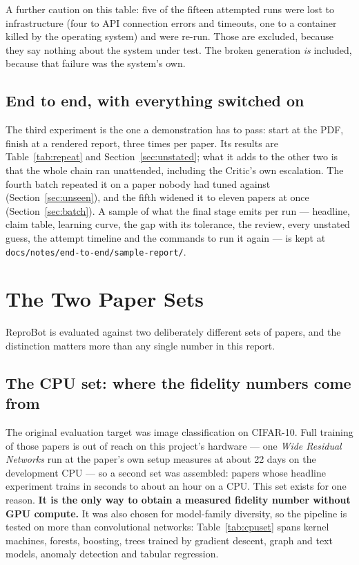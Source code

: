 \documentclass[10pt,twocolumn]{article}
\begin{document}
A further caution on this table: five of the fifteen attempted runs were lost to infrastructure
(four to API connection errors and timeouts, one to a container killed by the operating system)
and were re-run. Those are excluded, because they say nothing about the system under test. The
broken generation \emph{is} included, because that failure was the system's own.

\subsection{End to end, with everything switched on}

The third experiment is the one a demonstration has to pass: start at the PDF, finish at a
rendered report, three times per paper. Its results are Table~\ref{tab:repeat} and
Section~\ref{sec:unstated}; what it adds to the other two is that the whole chain ran unattended,
including the Critic's own escalation. The fourth batch repeated it on a paper nobody had tuned
against (Section~\ref{sec:unseen}), and the fifth widened it to eleven papers at once
(Section~\ref{sec:batch}). A sample of what the final stage emits per run --- headline,
claim table, learning curve, the gap with its tolerance, the review, every unstated guess, the
attempt timeline and the commands to run it again --- is kept at
\texttt{docs/notes/end-to-end/sample-report/}.

\section{The Two Paper Sets}
\label{sec:sets}

ReproBot is evaluated against two deliberately different sets of papers, and the distinction
matters more than any single number in this report.

\subsection{The CPU set: where the fidelity numbers come from}

The original evaluation target was image classification on CIFAR-10. Full training of those
papers is out of reach on this project's hardware --- one \emph{Wide Residual Networks} run at the
paper's own setup measures at about 22 days on the development CPU --- so a second set was
assembled: papers whose headline experiment trains in seconds to about an hour on a CPU. This set
exists for one reason. \textbf{It is the only way to obtain a measured fidelity number without GPU
compute.} It was also chosen for model-family diversity, so the pipeline is tested on more than
convolutional networks: Table~\ref{tab:cpuset} spans kernel machines, forests, boosting, trees
trained by gradient descent, graph and text models, anomaly detection and tabular regression.
\end{document}
